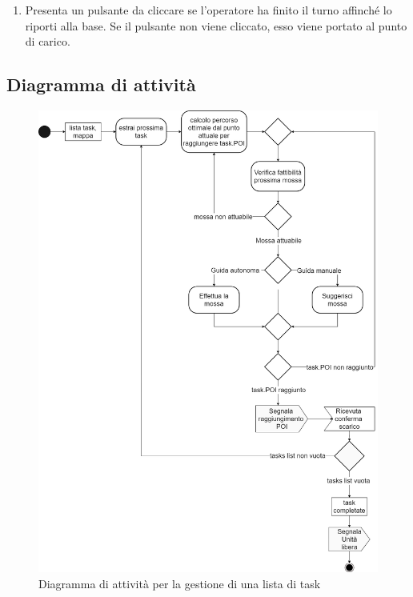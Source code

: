 \begin{itemize}
{\begin{enumerate}
\begin{enumerate}
\begin{itemize}
\begin{itemize}
				\end{itemize}				
				\item{attende la conferma dell'operatore che dichiara di aver eseguito lo scarico\\}
			\end{itemize}						
			\item{passa alla task successiva\\}				
		\end{enumerate}
		\item{Presenta un pulsante da cliccare se l'operatore ha finito il turno affinché lo riporti alla base. Se il pulsante non viene cliccato, esso viene portato al punto di carico. \\}
	\end{enumerate}
	}
\end{itemize}
\subsection{Diagramma di attività}
\begin{figure}[H]
	\centering
	\includegraphics[scale=0.3]{res/images/diagramma_di_attivita2.png}
	\caption{Diagramma di attività per la gestione di una lista di task}
\end{figure}
